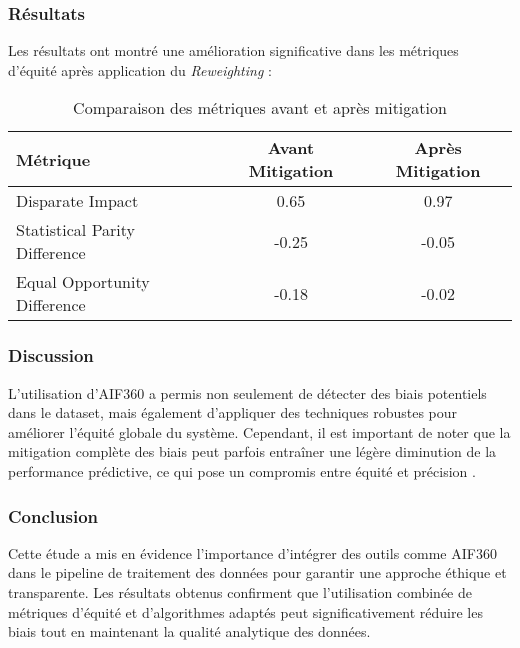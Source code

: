 \documentclass{article}
\begin{document}
\subsubsection{Résultats}

Les résultats ont montré une amélioration significative dans les métriques d'équité après application du \textit{Reweighting} :

\begin{table}[h]
\centering
\caption{Comparaison des métriques avant et après mitigation}
\begin{tabular}{lcc}
\toprule
Métrique & Avant Mitigation & Après Mitigation \\
\midrule
Disparate Impact & 0.65 & 0.97 \\
Statistical Parity Difference & -0.25 & -0.05 \\
Equal Opportunity Difference & -0.18 & -0.02 \\
\bottomrule
\end{tabular}
\end{table}

\subsubsection{Discussion}

L'utilisation d'AIF360 a permis non seulement de détecter des biais potentiels dans le dataset, mais également d'appliquer des techniques robustes pour améliorer l'équité globale du système. Cependant, il est important de noter que la mitigation complète des biais peut parfois entraîner une légère diminution de la performance prédictive, ce qui pose un compromis entre équité et précision \cite{aif360_paper}.

\subsubsection{Conclusion}

Cette étude a mis en évidence l'importance d'intégrer des outils comme AIF360 dans le pipeline de traitement des données pour garantir une approche éthique et transparente. Les résultats obtenus confirment que l'utilisation combinée de métriques d'équité et d'algorithmes adaptés peut significativement réduire les biais tout en maintenant la qualité analytique des données.



\end{document}
